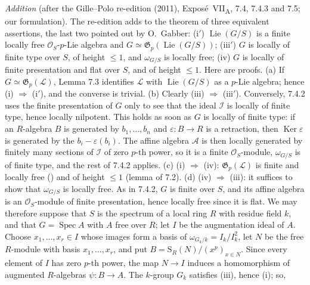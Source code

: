 \par\medskip\noindent
\emph{Addition} (after the Gille--Polo re-edition (2011),
Expos\'e~VII\textsubscript{A}, 7.4, 7.4.3 and 7.5; our formulation). The
re-edition adds to the theorem of  three equivalent assertions, the
last two pointed out by O.~Gabber:
(i\('\)) \(\operatorname{Lie}(G/S)\) is a finite locally free
\(\mathcal O_S\)-\(p\)-Lie algebra and
\(G\simeq\mathfrak G_p(\operatorname{Lie}(G/S))\);
(iii\('\)) \(G\) is locally of finite type over \(S\), of height
\(\leq1\), and \(\omega_{G/S}\) is locally free;
(iv) \(G\) is locally of finite presentation and flat over \(S\), and of
height \(\leq1\). Here are proofs.
(a) If \(G\simeq\mathfrak G_p(\mathcal L)\), Lemma 7.3 identifies
\(\mathcal L\) with \(\operatorname{Lie}(G/S)\) as a \(p\)-Lie algebra;
hence (i) \(\Rightarrow\) (i\('\)), and the converse is trivial.
(b) Clearly (iii) \(\Rightarrow\) (iii\('\)). Conversely, 7.4.2 uses the
finite presentation of \(G\) only to see that the ideal \(\mathcal I\) is
locally of finite type, hence locally nilpotent. This holds as soon as
\(G\) is locally of finite type: if an \(R\)-algebra \(B\) is generated by
\(b_1,\ldots,b_n\) and \(\varepsilon:B\to R\) is a retraction, then
\(\operatorname{Ker}\varepsilon\) is generated by the
\(b_i-\varepsilon(b_i)\). The affine algebra \(\mathcal A\) is then
locally generated by finitely many sections of \(\mathcal I\) of zero
\(p\)-th power, so it is a finite \(\mathcal O_S\)-module, \(\omega_{G/S}\)
is of finite type, and the rest of 7.4.2 applies.
(c) (i) \(\Rightarrow\) (iv): \(\mathfrak G_p(\mathcal L)\) is finite and
locally free () and of height \(\leq1\) (lemma of 7.2).
(d) (iv) \(\Rightarrow\) (iii): it suffices to show that
\(\omega_{G/S}\) is locally free. As in 7.4.2, \(G\) is finite over \(S\),
and its affine algebra is an \(\mathcal O_S\)-module of finite
presentation, hence locally free since it is flat. We may therefore
suppose that \(S\) is the spectrum of a local ring \(R\) with residue field
\(k\), and that \(G=\operatorname{Spec}A\) with \(A\) free over \(R\); let
\(I\) be the augmentation ideal of \(A\). Choose
\(x_1,\ldots,x_r\in I\) whose images form a basis of
\(\omega_{G_k/k}=I_k/I_k^2\), let \(N\) be the free \(R\)-module with
basis \(x_1,\ldots,x_r\), and put \(B=\mathrm S_R(N)/(x^p)_{x\in N}\).
Since every element of \(I\) has zero \(p\)-th power, the map
\(N\to I\) induces a homomorphism of augmented \(R\)-algebras
\(\psi:B\to A\). The \(k\)-group \(G_k\) satisfies (iii), hence (i); so,
